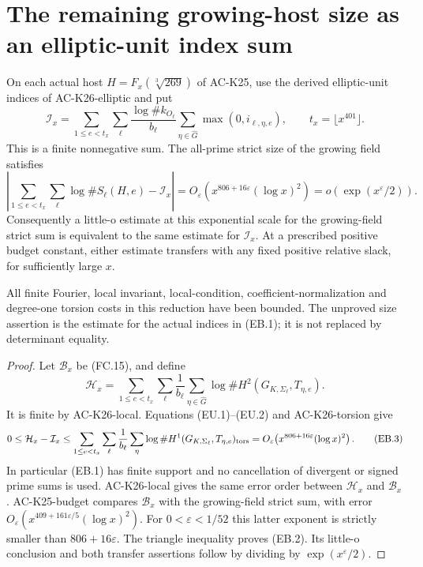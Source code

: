 \section{The remaining growing-host size as an elliptic-unit index sum}
\label{sec:elliptic-unit-budget}

\begin{theorem}
\label{AC-K27}
On each actual host $H=F_x(\sqrt[3]{269})$ of AC-K25,
use the derived elliptic-unit indices of AC-K26-elliptic
and put
\[
 \mathcal I_x=
 \sum_{1\leq e<t_x}\sum_\ell
       \frac{\log\#k_{O_\ell}}{b_\ell}
            \sum_{\eta\in\widehat G}\max(0,i_{\ell,\eta,e}),
       \qquad t_x=\lfloor x^{401}\rfloor .           \tag{EB.1}
\]
This is a finite nonnegative sum.  The all-prime
strict size of the growing field satisfies
\[
 \left|\sum_{1\leq e<t_x}\sum_\ell\log\#S_\ell(H,e)
                                      -\mathcal I_x\right|
    =O_\varepsilon\!\left(
             x^{806+16\varepsilon}(\log x)^2\right)
    =o\!\left(\exp(x^\varepsilon/2)\right).          \tag{EB.2}
\]
Consequently a little-o estimate at this exponential
scale for the growing-field strict sum is equivalent
to the same estimate for $\mathcal I_x$.
At a prescribed positive budget constant, either
estimate transfers with any fixed positive relative
slack, for sufficiently large $x$.

All finite Fourier, local invariant, local-condition,
coefficient-normalization and degree-one torsion costs
in this reduction have been bounded.  The unproved
size assertion is the estimate for the actual indices
in (EB.1); it is not replaced by determinant equality.
\end{theorem}
\begin{proof}
Let $\mathcal B_x$ be (FC.15), and define
\[
 \mathcal H_x=
 \sum_{1\leq e<t_x}\sum_\ell\frac1{b_\ell}
             \sum_{\eta\in\widehat G}
                    \log\#H^2(G_{K,\Sigma_\ell},T_{\eta,e}).
\]
It is finite by AC-K26-local.  Equations (EU.1)--(EU.2)
and AC-K26-torsion give
\[
 0\leq\mathcal H_x-\mathcal I_x
   \leq\sum_{1\leq e<t_x}\sum_\ell\frac1{b_\ell}
            \sum_\eta\log\#H^1(G_{K,\Sigma_\ell},T_{\eta,e})_{\rm tors}
   =O_\varepsilon\!\left(
              x^{806+16\varepsilon}(\log x)^2\right).
                                                            \tag{EB.3}
\]
In particular (EB.1) has finite support and no
cancellation of divergent or signed prime sums is used.
AC-K26-local gives the same error order between
$\mathcal H_x$ and $\mathcal B_x$.
AC-K25-budget compares $\mathcal B_x$ with the
growing-field strict sum, with error
$O_\varepsilon(x^{409+161\varepsilon/5}(\log x)^2)$.
For $0<\varepsilon<1/52$ this latter exponent is
strictly smaller than $806+16\varepsilon$.
The triangle inequality proves (EB.2).
Its little-o conclusion and both transfer assertions
follow by dividing by $\exp(x^\varepsilon/2)$.
\end{proof}

